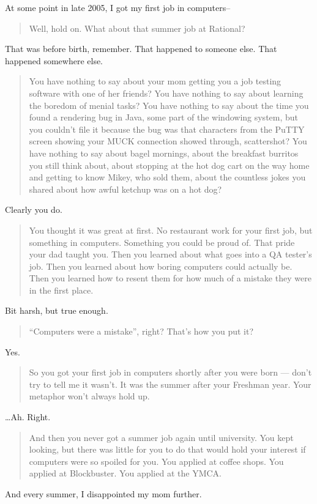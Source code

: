 At some point in late 2005, I got my first job in computers--

\begin{quote}
Well, hold on. What about that summer job at Rational?
\end{quote}

That was before birth, remember. That happened to someone else. That happened somewhere else.

\begin{quote}
You have nothing to say about your mom getting you a job testing software with one of her friends? You have nothing to say about learning the boredom of menial tasks? You have nothing to say about the time you found a rendering bug in Java, some part of the windowing system, but you couldn't file it because the bug was that characters from the PuTTY screen showing your MUCK connection showed through, scattershot? You have nothing to say about bagel mornings, about the breakfast burritos you still think about, about stopping at the hot dog cart on the way home and getting to know Mikey, who sold them, about the countless jokes you shared about how awful ketchup was on a hot dog?
\end{quote}

Clearly you do.

\begin{quote}
You thought it was great at first. No restaurant work for your first job, but something in computers. Something you could be proud of. That pride your dad taught you. Then you learned about what goes into a QA tester's job. Then you learned about how boring computers could actually be. Then you learned how to resent them for how much of a mistake they were in the first place.
\end{quote}

Bit harsh, but true enough.

\begin{quote}
``Computers were a mistake'', right? That's how you put it?
\end{quote}

Yes.

\begin{quote}
So you got your first job in computers shortly after you were born --- don't try to tell me it wasn't. It was the summer after your Freshman year. Your metaphor won't always hold up.
\end{quote}

\ldots{}Ah. Right.

\begin{quote}
And then you never got a summer job again until university. You kept looking, but there was little for you to do that would hold your interest if computers were so spoiled for you. You applied at coffee shops. You applied at Blockbuster. You applied at the YMCA.
\end{quote}

And every summer, I disappointed my mom further.
